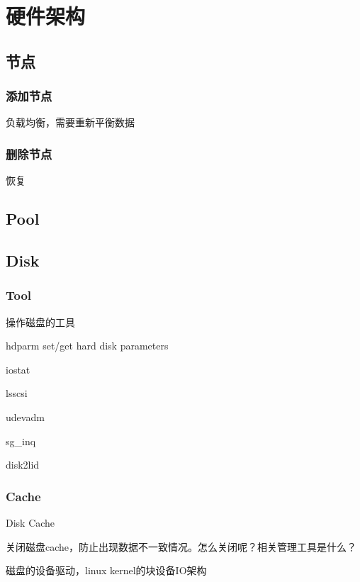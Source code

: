 \chapter{硬件架构}

\section{节点}

\subsection{添加节点}

负载均衡，需要重新平衡数据

\subsection{删除节点}

恢复


\section{Pool}

\section{Disk}

\subsection{Tool}

操作磁盘的工具
\begin{enumbox}
\item hdparm set/get hard disk parameters
\item iostat
\item lsscsi
\item udevadm
\item sg\_inq
\item disk2lid
\end{enumbox}

\subsection{Cache}

Disk Cache

关闭磁盘cache，防止出现数据不一致情况。怎么关闭呢？相关管理工具是什么？

磁盘的设备驱动，linux kernel的块设备IO架构


